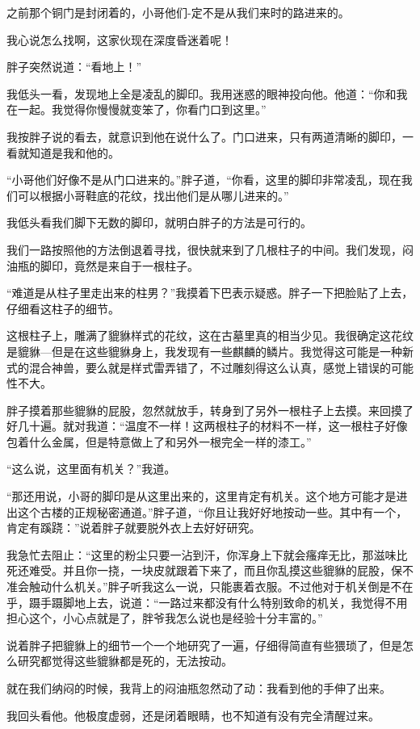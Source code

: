 之前那个铜门是封闭着的，小哥他们-定不是从我们来时的路进来的。

我心说怎么找啊，这家伙现在深度昏迷着呢！

胖子突然说道：“看地上！”

我低头一看，发现地上全是凌乱的脚印。我用迷惑的眼神投向他。他道：“你和我在一起。我觉得你慢慢就变笨了，你看门口到这里。”

我按胖子说的看去，就意识到他在说什么了。门口进来，只有两道清晰的脚印，一看就知道是我和他的。

“小哥他们好像不是从门口进来的。”胖子道，“你看，这里的脚印非常凌乱，现在我们可以根据小哥鞋底的花纹，找出他们是从哪儿进来的。”

我低头看我们脚下无数的脚印，就明白胖子的方法是可行的。

我们一路按照他的方法倒退着寻找，很快就来到了几根柱子的中间。我们发现，闷油瓶的脚印，竟然是来自于一根柱子。

“难道是从柱子里走出来的柱男？”我摸着下巴表示疑惑。胖子一下把脸贴了上去，仔细看这柱子的细节。

这根柱子上，雕满了貔貅样式的花纹，这在古墓里真的相当少见。我很确定这花纹是貔貅—但是在这些貔貅身上，我发现有一些麒麟的鳞片。我觉得这可能是一种新式的混合神兽，要么就是样式雷弄错了，不过雕刻得这么认真，感觉上错误的可能性不大。

胖子摸着那些貔貅的屁股，忽然就放手，转身到了另外一根柱子上去摸。来回摸了好几十遍。就对我道：“温度不一样！这两根柱子的材料不一样，这一根柱子好像包着什么金属，但是特意做上了和另外一根完全一样的漆工。”

“这么说，这里面有机关？”我道。

“那还用说，小哥的脚印是从这里出来的，这里肯定有机关。这个地方可能才是进出这个古楼的正规秘密通道。”胖子道，“你且让我好好地按动一些。其中有一个，肯定有蹊跷：”说着胖子就要脱外衣上去好好研究。

我急忙去阻止：“这里的粉尘只要一沾到汗，你浑身上下就会瘙痒无比，那滋味比死还难受。并且你一挠，一块皮就跟着下来了，而且你乱摸这些貔貅的屁股，保不准会触动什么机关。”胖子听我这么一说，只能裹着衣服。不过他对于机关倒是不在乎，蹑手蹑脚地上去，说道：“一路过来都没有什么特别致命的机关，我觉得不用担心这个，小心点就是了，胖爷我怎么说也是经验十分丰富的。”

说着胖子把貔貅上的细节一个一个地研究了一遍，仔细得简直有些猥琐了，但是怎么研究都觉得这些貔貅都是死的，无法按动。

就在我们纳闷的时候，我背上的闷油瓶忽然动了动：我看到他的手伸了出来。

我回头看他。他极度虚弱，还是闭着眼睛，也不知道有没有完全清醒过来。


